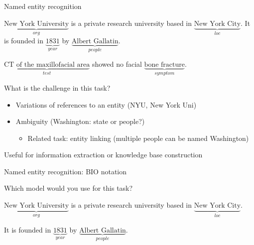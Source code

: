 \documentclass[usenames,dvipsnames,notes,11pt,aspectratio=169,hyperref={colorlinks=true, linkcolor=blue}]{beamer}
\begin{document}
\begin{frame}
    {Named entity recognition}

        {
            $\underbrace{\text{New York University}}_{{\textstyle org}}$ is a private research university based in $\underbrace{\text{New York City}}_{{\textstyle loc}}$.
            It is founded in $\underbrace{\text{1831}}_{{\textstyle year}}$ by $\underbrace{\text{Albert Gallatin}}_{{\textstyle people}}$.\par
            \pause
            $\underbrace{\text{CT of the maxillofacial area}}_{{\textstyle test}}$ showed no facial $\underbrace{\text{bone fracture}}_{{\textstyle symptom}}$.\par
        }

        What is the challenge in this task?\\\pause
        \begin{itemize}
            \item Variations of references to an entity (NYU, New York Uni)
            \item Ambiguity (Washington: state or people?)
                \begin{itemize}
            \item Related task: entity linking (multiple people can be named Washington)
                \end{itemize}
        \end{itemize}

        \pause\medskip
        Useful for information extraction or knowledge base construction
\end{frame}

\begin{frame}
    {Named entity recognition: BIO notation}

    Which model would you use for this task?

        {
            $\underbrace{\text{New York University}}_{{\textstyle org}}$ is a private research university based in $\underbrace{\text{New York City}}_{{\textstyle loc}}$.\par
            It is founded in $\underbrace{\text{1831}}_{{\textstyle year}}$ by $\underbrace{\text{Albert Gallatin}}_{{\textstyle people}}$.\par
        }
\end{frame}
\end{document}
